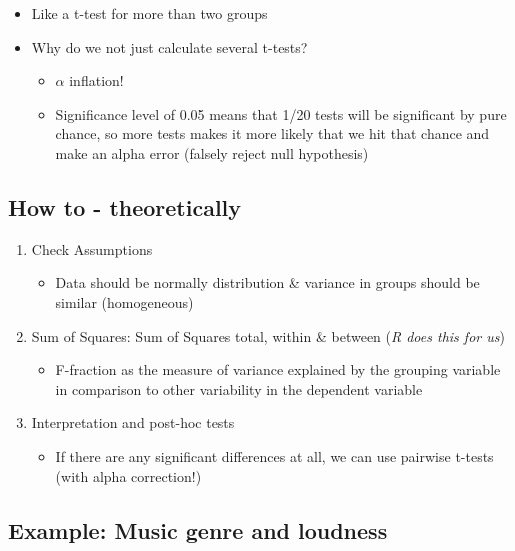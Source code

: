 \documentclass[
]{book}
\providecommand{\tightlist}{%
  \setlength{\itemsep}{0pt}\setlength{\parskip}{0pt}}
\begin{document}
\begin{itemize}
\tightlist
\item
  Like a t-test for more than two groups
\item
  Why do we not just calculate several t-tests?

  \begin{itemize}
  \tightlist
  \item
    \(\alpha\) inflation!
  \item
    Significance level of 0.05 means that 1/20 tests will be significant by pure chance, so more tests makes it more likely that we hit that chance and make an alpha error (falsely reject null hypothesis)
  \end{itemize}
\end{itemize}

\subsection{How to - theoretically}\label{how-to---theoretically}

\begin{enumerate}
\def\labelenumi{\arabic{enumi}.}
\tightlist
\item
  Check Assumptions

  \begin{itemize}
  \tightlist
  \item
    Data should be normally distribution \& variance in groups should be similar (homogeneous)
  \end{itemize}
\item
  Sum of Squares: Sum of Squares total, within \& between (\emph{R does this for us})

  \begin{itemize}
  \tightlist
  \item
    F-fraction as the measure of variance explained by the grouping variable in comparison to other variability in the dependent variable
  \end{itemize}
\item
  Interpretation and post-hoc tests

  \begin{itemize}
  \tightlist
  \item
    If there are any significant differences at all, we can use pairwise t-tests (with alpha correction!)
  \end{itemize}
\end{enumerate}

\subsection{\texorpdfstring{Example: Music genre and loudness }{Example: Music genre and loudness }}\label{example-music-genre-and-loudness}
\end{document}
